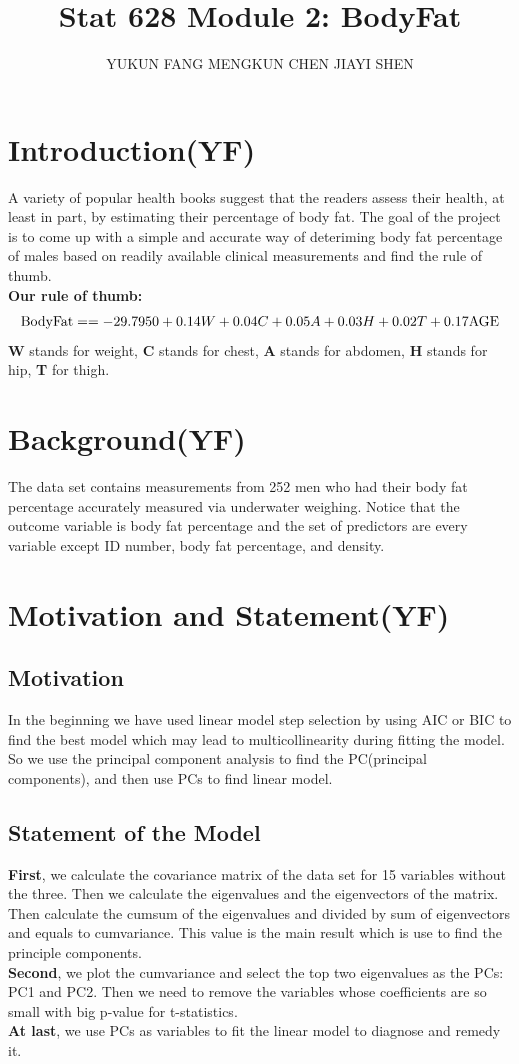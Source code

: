 \documentclass[12pt]{article}
\title{\vspace{-4em}Stat 628 Module 2: BodyFat}
\author{YUKUN FANG \quad MENGKUN CHEN \quad JIAYI SHEN}
\date{}
\begin{document}
\sffamily

\maketitle
\section{\sffamily Introduction(YF)}
A variety of popular health books suggest that the readers assess their 
health, at least in part, by estimating their percentage of body fat.
The goal of the project is to come up with 
a simple and accurate way of deteriming body fat percentage of males
based on readily available clinical measurements and find the rule of thumb.\\
\textbf{Our rule of thumb:} $$ {\rm BodyFat} =  = -29.7950 + 0.14W + 0.04C + 0.05A+ 0.03H +0.02T + 0.17{\rm AGE}$$
\textbf{W} stands for weight, \textbf{C} stands for chest, \textbf{A} stands for abdomen, \textbf{H} stands for hip, \textbf{T} for thigh.
\section{\sffamily Background(YF)}
The data set contains measurements from 252 men who had their body fat 
percentage accurately measured via underwater weighing. Notice that the 
outcome variable is body fat percentage and the set of predictors are 
every variable except ID number, body fat percentage, and density.
\section{\sffamily Motivation and Statement(YF)}
\subsection{\sffamily Motivation}
In the beginning we have used linear model step selection by using 
AIC or BIC to find the best model which may lead to multicollinearity during fitting the model.
So we use the principal component analysis to find the PC(principal components), and
then use PCs to find linear model.

\subsection{\sffamily Statement of the Model}
\textbf{First}, we calculate the covariance matrix of the data set for 15 variables without the three.
Then we calculate the eigenvalues and the eigenvectors of the matrix.
Then calculate the cumsum of the eigenvalues and divided by sum of eigenvectors and equals to cumvariance. 
This value is the main result which is use to find the principle components.\\
\textbf{Second}, we plot the cumvariance and select the top two eigenvalues as the PCs: PC1 and PC2.
Then we need to remove the variables whose coefficients are so small with big p-value for t-statistics.\\
\textbf{At last}, we use PCs as variables to fit the linear model to diagnose and remedy it.
\end{document}
